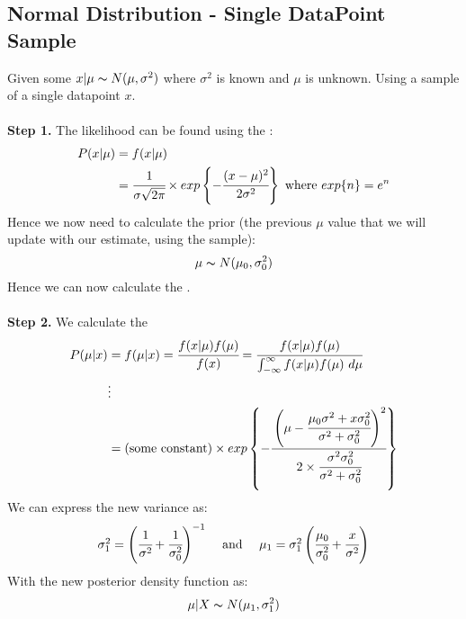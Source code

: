 \subsection{Normal Distribution - Single DataPoint Sample}
Given some $x|\mu \thicksim N(\mu, \sigma^2)$ where $\sigma^2$ is known and $\mu$ is unknown. Using a sample of a single datapoint $x$.
\\
\\ \textbf{Step 1.} The likelihood can be found using the :
\[\begin{split}
		P(x|\mu) &= f(x|\mu) \\
		&= \cfrac{1}{\sigma \sqrt{2 \pi}} \times exp \left\{ -\cfrac{(x - \mu)^2}{2 \sigma^2} \right\} \text{  where  $exp\{n\} = e^n$}\\
	\end{split}\]
Hence we now need to calculate the prior (the previous $\mu$ value that we will update with our estimate, using the sample):
\[\mu \thicksim N(\mu_0, \sigma^2_0)\]
Hence we can now calculate the .
\\
\\ \textbf{Step 2.} We calculate the 
\[\begin{split}
		P(\mu|x) &= f(\mu|x) = \cfrac{f(x|\mu)f(\mu)}{f(x)} = \cfrac{f(x|\mu)f(\mu)}{\int_{-\infty}^\infty f(x|\mu)f(\mu) \ d \mu} \\
		& \vdots \\
		&= \text{(some constant)} \times exp\left\{ -\cfrac{\left( \mu - \cfrac{\mu_0\sigma^2 + x \sigma_0^2}{\sigma^2 + \sigma_0^2} \right)^2}{2 \times \cfrac{\sigma^2\sigma_0^2}{\sigma^2 + \sigma_0^2}} \right\} \\
	\end{split}\]
We can express the new variance as:
\[\begin{matrix}
		\sigma^2_1 = \left( \cfrac{1}{\sigma^2} + \cfrac{1}{\sigma_0^2} \right)^{-1} & \text{  and  } & \mu_1 = \sigma_1^2 \left( \cfrac{\mu_0}{\sigma_0^2} + \cfrac{x}{\sigma^2} \right) \\
	\end{matrix}\]
With the new posterior density function as:
\[\mu|X \thicksim N(\mu_1, \sigma^2_1)\]
